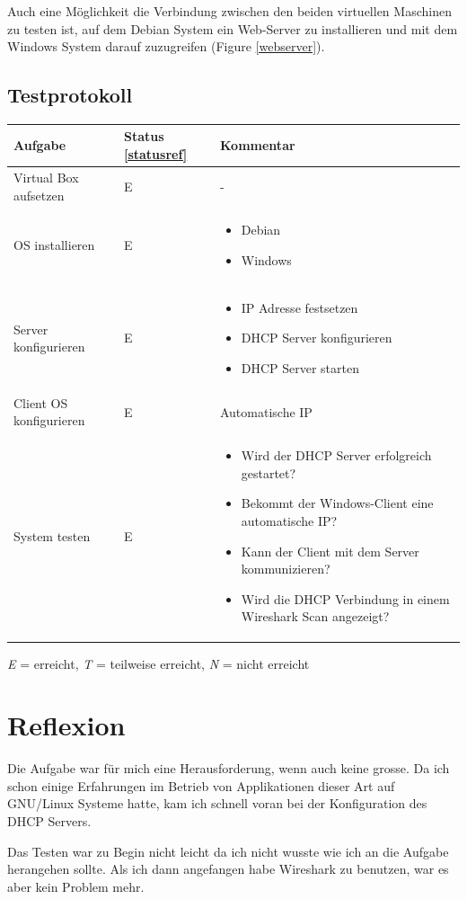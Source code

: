 \documentclass[12pt,a4paper,twoside,titlepage]{article}
\begin{document}
        Auch eine Möglichkeit die Verbindung zwischen den beiden virtuellen Maschinen zu testen ist, auf dem Debian System ein Web-Server zu installieren und mit dem Windows System darauf zuzugreifen (Figure \ref{webserver}).

        \subsection{Testprotokoll}


        \begin{tabular}{|l|l|p{7cm}|}
          \hline
          \textbf{Aufgabe} & \textbf{Status \ref{statusref}} & \textbf{Kommentar} \\\hline
          Virtual Box aufsetzen & E & - \\\hline
          OS installieren & E & \begin{itemize}
          \item Debian
          \item Windows
          \end{itemize} \\\hline
          Server konfigurieren & E & \begin{itemize}
          	\item IP Adresse festsetzen
          	\item DHCP Server konfigurieren
          	\item DHCP Server starten
          \end{itemize}\\\hline 
          Client OS konfigurieren & E & Automatische IP \\\hline
          System testen & E & \begin{itemize}
          	\item Wird der DHCP Server erfolgreich gestartet?
          	\item Bekommt der Windows-Client eine automatische IP?
          	\item Kann der Client mit dem Server kommunizieren?
                \item Wird die DHCP Verbindung in einem Wireshark Scan angezeigt?
          \end{itemize}\\\hline
        \end{tabular}

        \label{statusref}
        \textit{E} = erreicht, \textit{T} = teilweise erreicht, \textit{N} = nicht erreicht 
        
        \section{Reflexion}
        
        Die Aufgabe war für mich eine Herausforderung, wenn auch keine grosse. Da ich schon einige Erfahrungen im Betrieb von Applikationen dieser Art auf GNU/Linux Systeme hatte, kam ich schnell voran bei der Konfiguration des DHCP Servers.

        Das Testen war zu Begin nicht leicht da ich nicht wusste wie ich an die Aufgabe herangehen sollte. Als ich dann angefangen habe Wireshark zu benutzen, war es aber kein Problem mehr. 
        
        
\end{document}
